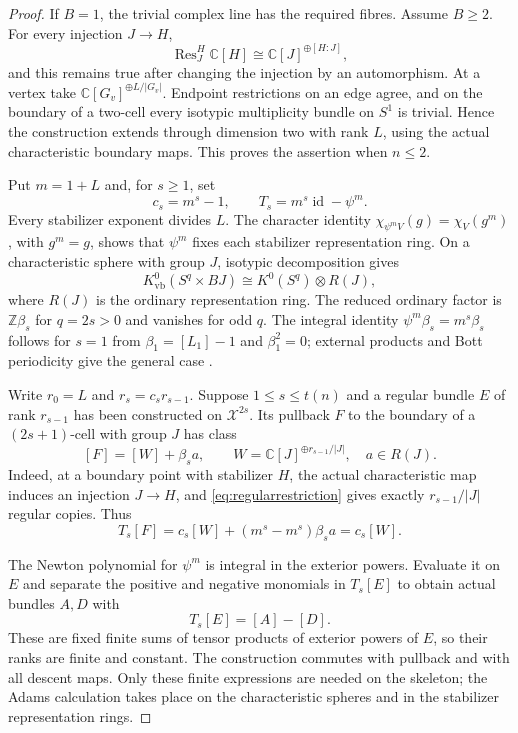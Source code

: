 \documentclass[11pt,a4paper,reqno]{amsart}
\numberwithin{equation}{section}
\theoremstyle{remark}
\theoremstyle{plain}
\newcommand{\X}{\mathcal X}
\newcommand{\C}{\mathbb C}
\newcommand{\Res}{\operatorname{Res}}
\newcommand{\id}{\operatorname{id}}
\begin{document}
\begin{proof}
If $B=1$, the trivial complex line has the required fibres. Assume $B\geq2$.
For every injection $J\to H$,
\begin{equation}\label{eq:regularrestriction}
 \Res^H_J\C[H]\cong\C[J]^{\oplus[H:J]},
\end{equation}
and this remains true after changing the injection by an automorphism. At a
vertex take $\C[G_v]^{\oplus L/|G_v|}$. Endpoint restrictions on an edge
agree, and on the boundary of a two-cell every isotypic multiplicity bundle
on $S^1$ is trivial. Hence the construction extends through dimension two
with rank $L$, using the actual characteristic boundary maps. This proves
the assertion when $n\leq2$.

Put $m=1+L$ and, for $s\geq1$, set
\begin{equation}\label{eq:adams}
 c_s=m^s-1,\qquad T_s=m^s\id-\psi^m.
\end{equation}
Every stabilizer exponent divides $L$. The character identity
$\chi_{\psi^m V}(g)=\chi_V(g^m)$, with $g^m=g$, shows that $\psi^m$ fixes
each stabilizer representation ring. On a characteristic sphere with group $J$,
isotypic decomposition gives
\[
 K^0_{\mathrm{vb}}(S^q\times BJ)\cong K^0(S^q)\otimes R(J),
\]
where $R(J)$ is the ordinary representation ring. The reduced ordinary
factor is $\mathbb Z\beta_s$ for $q=2s>0$ and vanishes for odd $q$.
The integral identity $\psi^m\beta_s=m^s\beta_s$ follows for $s=1$ from
$\beta_1=[L_1]-1$ and $\beta_1^2=0$; external products and Bott periodicity
give the general case \cite[Proposition~2.21]{Hatcher}.

Write $r_0=L$ and $r_s=c_sr_{s-1}$. Suppose $1\leq s\leq t(n)$ and a
regular bundle $E$ of rank $r_{s-1}$ has been constructed on $\X^{2s}$.
Its pullback $F$ to the boundary of a $(2s+1)$-cell with group $J$ has class
\[
 [F]=[W]+\beta_s a,\qquad
 W=\C[J]^{\oplus r_{s-1}/|J|},\quad a\in R(J).
\]
Indeed, at a boundary point with stabilizer $H$, the actual characteristic
map induces an injection $J\to H$, and \eqref{eq:regularrestriction} gives
exactly $r_{s-1}/|J|$ regular copies. Thus
\begin{equation}\label{eq:model-cancellation}
 T_s[F]=c_s[W]+(m^s-m^s)\beta_s a=c_s[W].
\end{equation}

The Newton polynomial for $\psi^m$ is integral in the exterior powers.
Evaluate it on $E$ and separate the positive and negative monomials in
$T_s[E]$ to obtain actual bundles $A,D$ with
\[
 T_s[E]=[A]-[D].
\]
These are fixed finite sums of tensor products of exterior powers of $E$,
so their ranks are finite and constant. The construction commutes with
pullback and with all descent maps. Only these finite expressions are
needed on the skeleton; the Adams calculation takes place on the
characteristic spheres and in the stabilizer representation rings.


\end{proof}
\end{document}
